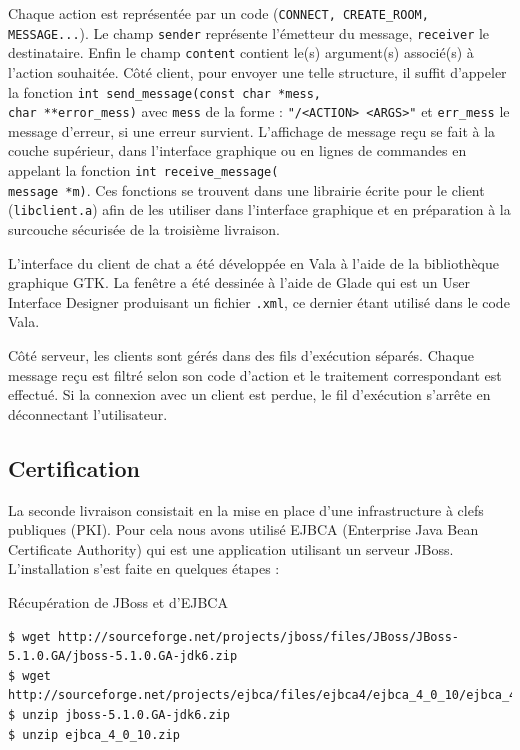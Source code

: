 \documentclass[a4paper,11pt,french]{book}
\begin{document}
Chaque action est représentée par un code (\verb+CONNECT, CREATE_ROOM, MESSAGE...+). Le champ \verb+sender+ représente l'émetteur du message, \verb+receiver+ le destinataire. Enfin le champ \verb+content+ contient le(s) argument(s) associé(s) à l'action souhaitée. Côté client, pour envoyer une telle structure, il suffit d'appeler la fonction \verb+int send_message(const char *mess,+\\ \verb+char **error_mess)+ avec \verb+mess+ de la forme : \verb+"/<ACTION> <ARGS>"+ et \verb+err_mess+ le message d'erreur, si une erreur survient. L'affichage de message reçu se fait à la couche supérieur, dans l'interface graphique ou en lignes de commandes en appelant la fonction \verb+int receive_message(+\\\verb+message *m)+. Ces fonctions se trouvent dans une librairie écrite pour le client (\verb+libclient.a+) afin de les utiliser dans l'interface graphique et en préparation à la surcouche sécurisée de la troisième livraison. 

L'interface du client de chat a été développée en Vala à l'aide de la bibliothèque graphique GTK. La fenêtre a été dessinée à l'aide de Glade qui est un User Interface Designer produisant un fichier \verb+.xml+, ce dernier étant utilisé dans le code Vala.

Côté serveur, les clients sont gérés dans des fils d'exécution séparés. Chaque message reçu est filtré selon son code d'action et le traitement correspondant est effectué. Si la connexion avec un client est perdue, le fil d'exécution s'arrête en déconnectant l'utilisateur.

\subsection{Certification}
La seconde livraison consistait en la mise en place d'une infrastructure à clefs publiques (PKI). Pour cela nous avons utilisé EJBCA (Enterprise Java Bean Certificate Authority) qui est une application utilisant un serveur JBoss. L'installation s'est faite en quelques étapes :

\begin{paragraph}{Récupération de JBoss et d'EJBCA}
\small{
\begin{verbatim}
$ wget http://sourceforge.net/projects/jboss/files/JBoss/JBoss-5.1.0.GA/jboss-5.1.0.GA-jdk6.zip
$ wget http://sourceforge.net/projects/ejbca/files/ejbca4/ejbca_4_0_10/ejbca_4_0_10.zip
$ unzip jboss-5.1.0.GA-jdk6.zip
$ unzip ejbca_4_0_10.zip
\end{verbatim}
}
\end{paragraph}
\end{document}

